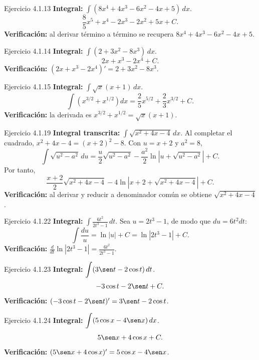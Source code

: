 \begin{examplebox}{Ejercicio 4.1.13}
\textbf{Integral:} $\displaystyle \int(8x^4+4x^3-6x^2-4x+5)\,dx$.
\[
 \frac{8}{5}x^5+x^4-2x^3-2x^2+5x+C.
\]
\textbf{Verificación:} al derivar término a término se recupera $8x^4+4x^3-6x^2-4x+5$.
\end{examplebox}

\begin{examplebox}{Ejercicio 4.1.14}
\textbf{Integral:} $\displaystyle \int(2+3x^2-8x^3)\,dx$.
\[
 2x+x^3-2x^4+C.
\]
\textbf{Verificación:} $(2x+x^3-2x^4)'=2+3x^2-8x^3$.
\end{examplebox}

\begin{examplebox}{Ejercicio 4.1.15}
\textbf{Integral:} $\displaystyle \int\sqrt{x}(x+1)\,dx$.
\[
 \int(x^{3/2}+x^{1/2})dx
 =\frac{2}{5}x^{5/2}+\frac{2}{3}x^{3/2}+C.
\]
\textbf{Verificación:} la derivada es $x^{3/2}+x^{1/2}=\sqrt{x}(x+1)$.
\end{examplebox}

\begin{examplebox}{Ejercicio 4.1.19}
\textbf{Integral transcrita:} $\displaystyle \int\sqrt{x^2+4x-4}\,dx$.
Al completar el cuadrado, $x^2+4x-4=(x+2)^2-8$. Con $u=x+2$ y $a^2=8$,
\[
 \int\sqrt{u^2-a^2}\,du
 =\frac{u}{2}\sqrt{u^2-a^2}-\frac{a^2}{2}
 \ln\left|u+\sqrt{u^2-a^2}\right|+C.
\]
Por tanto,
\[
 \frac{x+2}{2}\sqrt{x^2+4x-4}
 -4\ln\left|x+2+\sqrt{x^2+4x-4}\right|+C.
\]
\textbf{Verificación:} al derivar y reducir a denominador común se obtiene $\sqrt{x^2+4x-4}$.
\end{examplebox}

\begin{examplebox}{Ejercicio 4.1.22}
\textbf{Integral:} $\displaystyle \int\frac{6t^2}{2t^3-1}\,dt$.
Sea $u=2t^3-1$, de modo que $du=6t^2dt$:
\[
 \int\frac{du}{u}=\ln|u|+C=\ln|2t^3-1|+C.
\]
\textbf{Verificación:} $\displaystyle \frac{d}{dt}\ln|2t^3-1|=\frac{6t^2}{2t^3-1}$.
\end{examplebox}

\begin{examplebox}{Ejercicio 4.1.23}
\textbf{Integral:} $\displaystyle \int(3\sen t-2\cos t)\,dt$.
\[
 -3\cos t-2\sen t+C.
\]
\textbf{Verificación:} $(-3\cos t-2\sen t)'=3\sen t-2\cos t$.
\end{examplebox}

\begin{examplebox}{Ejercicio 4.1.24}
\textbf{Integral:} $\displaystyle \int(5\cos x-4\sen x)\,dx$.
\[
 5\sen x+4\cos x+C.
\]
\textbf{Verificación:} $(5\sen x+4\cos x)'=5\cos x-4\sen x$.
\end{examplebox}

